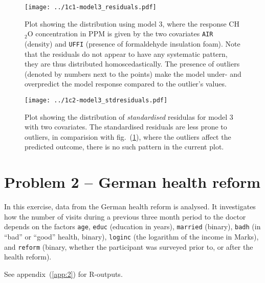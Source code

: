 \documentclass[a4paper,11pt]{article}
\begin{document}
\begin{enumerate}[label=1\alph*)]
        \begin{figure}[htb]
            \centering
            \texttt{[image: ../1c1-model3\_residuals.pdf]}
            \caption{Plot showing the distribution using model 3, where the response CH$_2$O concentration in PPM is given by the two covariates \texttt{AIR} (density) and \texttt{UFFI} (presence of formaldehyde insulation foam). Note that the residuals do not appear to have any systematic pattern, they are thus distributed homoscedastically. The presence of outliers (denoted by numbers next to the points) make the model under- and overpredict the model response compared to the outlier's values. }
            \label{fig:1c-1}
        \end{figure}
        \begin{figure}[htb]
            \centering
            \texttt{[image: ../1c2-model3\_stdresiduals.pdf]}
            \caption{Plot showing the distribution of \textit{standardised} residulas for model 3 with two covariates. The standardised residuals are less prone to outliers, in comparision with fig.~(\ref{fig:1c-1}), where the outliers affect the predicted outcome, there is no such pattern in the current plot. }
            \label{fig:1c-2}
        \end{figure}
\end{enumerate}

\clearpage
\section*{Problem 2 -- German health reform}
    In this exercise, data from the German health reform is analysed. It investigates how the number of visits during a previous three month period to the doctor depends on the factors \texttt{age}, \texttt{educ} (education in years), \texttt{married} (binary), \texttt{badh} (in ``bad'' or ``good'' health, binary), \texttt{loginc} (the logarithm of the income in Marks), and \texttt{reform} (binary, whether the participant was surveyed prior to, or after the health reform).
    
    See appendix~(\ref{app:2}) for R-outputs.
\end{document}
